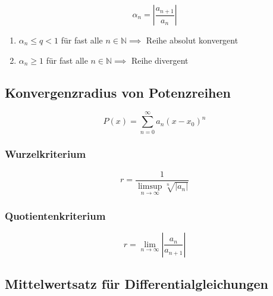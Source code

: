 \documentclass[]{article}
\begin{document}
				\begin{displaymath}
					\alpha_n = |\frac{a_{n+1}}{a_{n}}|
				\end{displaymath}
				
				\begin{enumerate}[]
					\item
						\begin{math} \alpha_n \leq q < 1 \end{math} für fast alle \begin{math} n \in \mathbb{N} \implies \end{math} Reihe absolut konvergent
					\item
						\begin{math} \alpha_n \geq 1\end{math} für fast alle \begin{math} n \in \mathbb{N} \implies \end{math} Reihe divergent
				\end{enumerate}
	
		\subsection{Konvergenzradius von Potenzreihen}
		
			\begin{displaymath}
				P(x) = \sum_{n=0}^{\infty} a_{n}(x-x_0)^n
			\end{displaymath}
			
			\subsubsection{Wurzelkriterium}
			
				\begin{displaymath}
					r = \frac{1}{\limsup\limits_{n \to \infty} \sqrt[n]{|a_{n}|}}
				\end{displaymath}
				
			\subsubsection{Quotientenkriterium}
			
				\begin{displaymath}
					r = \lim\limits_{n \to \infty} |\frac{a_{n}}{a_{n+1}}|
				\end{displaymath}
		
		\subsection{Mittelwertsatz für Differentialgleichungen}
		
\end{document}
